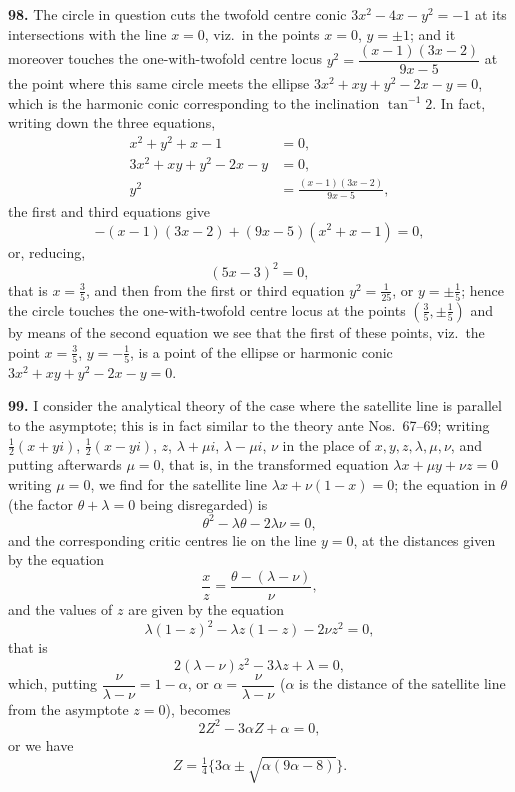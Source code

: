 \documentclass[11pt,a4paper]{article}
\theoremstyle{plain}
\begin{document}
\noindent\textbf{98.} The circle in question cuts the twofold centre conic $3x^2 - 4x - y^2 = -1$ at its intersections with the line $x = 0$, viz.\ in the points $x = 0$, $y = \pm 1$; and it moreover touches the one-with-twofold centre locus $y^2 = \dfrac{(x-1)(3x-2)}{9x-5}$ at the point where this same circle meets the ellipse $3x^2 + xy + y^2 - 2x - y = 0$, which is the harmonic conic corresponding to the inclination $\tan^{-1}2$. In fact, writing down the three equations,
\begin{align*}
x^2 + y^2 + x - 1 &= 0,\\
3x^2 + xy + y^2 - 2x - y &= 0,\\
y^2 &= \frac{(x-1)(3x-2)}{9x-5},
\end{align*}
the first and third equations give
\[
-(x-1)(3x-2) + (9x-5)(x^2+x-1) = 0,
\]
or, reducing,
\[
(5x-3)^2 = 0,
\]
that is $x = \tfrac{3}{5}$, and then from the first or third equation $y^2 = \tfrac{1}{25}$, or $y = \pm \tfrac{1}{5}$; hence the circle touches the one-with-twofold centre locus at the points $(\tfrac{3}{5}, \pm\tfrac{1}{5})$ and by means of the second equation we see that the first of these points, viz.\ the point $x = \tfrac{3}{5}$, $y = -\tfrac{1}{5}$, is a point of the ellipse or harmonic conic $3x^2 + xy + y^2 - 2x - y = 0$.

\noindent\textbf{99.} I consider the analytical theory of the case where the satellite line is parallel to the asymptote; this is in fact similar to the theory ante Nos.~67--69; writing $\tfrac{1}{2}(x+yi)$, $\tfrac{1}{2}(x-yi)$, $z$, $\lambda+\mu i$, $\lambda-\mu i$, $\nu$ in the place of $x, y, z, \lambda, \mu, \nu$, and putting afterwards $\mu = 0$, that is, in the transformed equation $\lambda x + \mu y + \nu z = 0$ writing $\mu = 0$, we find for the satellite line $\lambda x + \nu(1-x) = 0$; the equation in $\theta$ (the factor $\theta + \lambda = 0$ being disregarded) is
\[
\theta^2 - \lambda\theta - 2\lambda\nu = 0,
\]
and the corresponding critic centres lie on the line $y = 0$, at the distances given by the equation
\[
\frac{x}{z} = \frac{\theta - (\lambda - \nu)}{\nu},
\]
and the values of $z$ are given by the equation
\[
\lambda(1-z)^2 - \lambda z(1-z) - 2\nu z^2 = 0,
\]
that is
\[
2(\lambda - \nu)z^2 - 3\lambda z + \lambda = 0,
\]
which, putting $\dfrac{\nu}{\lambda - \nu} = 1 - \alpha$, or $\alpha = \dfrac{\nu}{\lambda - \nu}$ ($\alpha$ is the distance of the satellite line from the asymptote $z = 0$), becomes
\[
2Z^2 - 3\alpha Z + \alpha = 0,
\]
or we have
\[
Z = \tfrac{1}{4}\{3\alpha \pm \sqrt{\alpha(9\alpha-8)}\}.
\]
\end{document}
